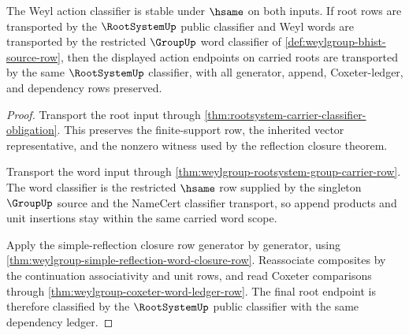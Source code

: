 \begin{theorem}
\label{thm:weylgroup-action-classifier-stability-row}
The Weyl action classifier is stable under $\hsame$ on both inputs. If root
rows are transported by the $\RootSystemUp$ public classifier and Weyl words
are transported by the restricted $\GroupUp$ word classifier of
\autoref{def:weylgroup-bhist-source-row}, then the displayed action endpoints
on carried roots are transported by the same $\RootSystemUp$ classifier, with
all generator, append, Coxeter-ledger, and dependency rows preserved.
\end{theorem}
\begin{proof}
Transport the root input through
\autoref{thm:rootsystem-carrier-classifier-obligation}. This preserves the
finite-support row, the inherited vector representative, and the nonzero
witness used by the reflection closure theorem.

Transport the word input through
\autoref{thm:weylgroup-rootsystem-group-carrier-row}. The word classifier is
the restricted $\hsame$ row supplied by the singleton $\GroupUp$ source and
the NameCert classifier transport, so append products and unit insertions stay
within the same carried word scope.

Apply the simple-reflection closure row generator by generator, using
\autoref{thm:weylgroup-simple-reflection-word-closure-row}. Reassociate
composites by the continuation associativity and unit rows, and read Coxeter
comparisons through \autoref{thm:weylgroup-coxeter-word-ledger-row}. The final
root endpoint is therefore classified by the $\RootSystemUp$ public classifier
with the same dependency ledger.
\end{proof}

